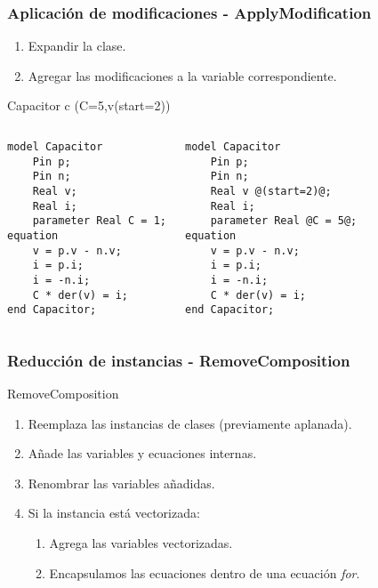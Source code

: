 \begin{frame}[fragile]
\frametitle{Aplicación de modificaciones - ApplyModification} 
\begin{block}{}
\begin{enumerate}
\item Expandir la clase.
\item Agregar las modificaciones a la variable correspondiente.
\end{enumerate}
\end{block}
\pause
Capacitor c (C=5,v(start=2))
\pause
\begin{columns} 
\begin{lstlisting}[style=base,basicstyle=\scriptsize]
model Capacitor 
    Pin p;
    Pin n;
    Real v;
    Real i;
    parameter Real C = 1;
equation
    v = p.v - n.v;
    i = p.i;
    i = -n.i;
    C * der(v) = i;
end Capacitor;
\end{lstlisting}
\begin{lstlisting}[style=base,basicstyle=\scriptsize]
model Capacitor 
    Pin p;
    Pin n;
    Real v @(start=2)@;
    Real i;
    parameter Real @C = 5@;
equation
    v = p.v - n.v;
    i = p.i;
    i = -n.i;
    C * der(v) = i;
end Capacitor;
\end{lstlisting}
\end{columns}
\end{frame}

\begin{frame}[fragile]
\frametitle{Reducción de instancias - RemoveComposition} 
\begin{block}{RemoveComposition}
\begin{enumerate}
\item Reemplaza las instancias de clases (previamente aplanada).
\item Añade las variables y ecuaciones internas.
\item Renombrar las variables añadidas.
\item Si la instancia está vectorizada: 
    \begin{enumerate}
    \item Agrega las variables vectorizadas.
    \item Encapsulamos las ecuaciones dentro de una ecuación \textit{for}.
    \end{enumerate} 
\end{enumerate}
\end{block}
\end{frame}

